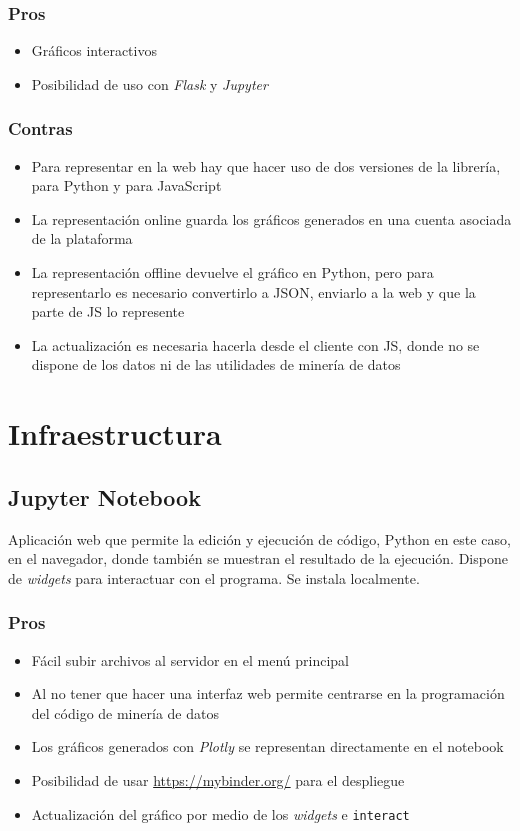\subsubsection{Pros}
\begin{itemize}
	\item Gráficos interactivos
	\item Posibilidad de uso con \textit{Flask} y \textit{Jupyter}
\end{itemize}
\subsubsection{Contras}
\begin{itemize}
	\item Para representar en la web hay que hacer uso de dos versiones de la
	librería, para Python y para JavaScript
	\item La representación online guarda los gráficos generados en una cuenta
	asociada de la plataforma
	\item La representación offline devuelve el gráfico en Python, pero para
	representarlo es necesario convertirlo a JSON, enviarlo a la web y que la parte
	de JS lo represente
	\item La actualización es necesaria hacerla desde el cliente con JS, donde no
	se dispone de los datos ni de las utilidades de minería de datos
\end{itemize}

\section{Infraestructura}
\subsection{Jupyter Notebook}
Aplicación web que permite la edición y ejecución de código, Python en este
caso, en el navegador, donde también se muestran el resultado de la ejecución.
Dispone de \textit{widgets} para interactuar con el programa. Se instala
localmente.
\subsubsection{Pros}
\begin{itemize}
	\item Fácil subir archivos al servidor en el menú principal
	\item Al no tener que hacer una interfaz web permite centrarse en la
	programación del código de minería de datos
	\item Los gráficos generados con \textit{Plotly} se representan directamente en
	el notebook
	\item Posibilidad de usar \url{https://mybinder.org/} para el despliegue
	\item Actualización del gráfico por medio de los \textit{widgets} e
	\verb|interact|
\end{itemize}
